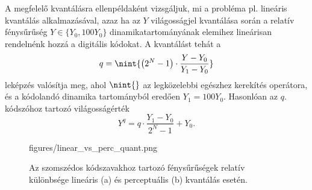 A megfelelő kvantálásra ellenpéldaként vizsgáljuk, mi a probléma pl. lineáris kvantálás alkalmazásával, azaz ha az $Y$ világosságjel kvantálása során a relatív fénysűrűség $Y \in \lbrace Y_0, 100 Y_0 \rbrace$ dinamikatartományának elemihez lineárisan rendelnénk hozzá a digitális kódokat.
A kvantálást tehát a 
\begin{equation}
q =  \nint{ \left( 2^N - 1 \right) \cdot  \frac{Y - Y_0 }{Y_1 - Y_0 } }
\end{equation}
leképzés valósítja meg, ahol $\nint{}$ az legközelebbi egészhez kerekítés operátora, és a kódolandó dinamika tartományból eredően $Y_1 = 100Y_0$.
Hasonlóan az $q.$ kódszóhoz tartozó világosságérték
\begin{equation}
Y^q = q \cdot \frac{Y_1 - Y_0}{2^N - 1} + Y_0.
\end{equation}

\begin{figure}[]
	\centering
	\begin{overpic}[width = 1\columnwidth ]{figures/linear_vs_perc_quant.png}
	\end{overpic}
	\caption{Az szomszédos kódszavakhoz tartozó fénysűrűségek relatív különbsége lineáris (a) és perceptuális (b) kvantálás esetén.}
	\label{Fig:linear_vs_perc_quant}
\end{figure}

